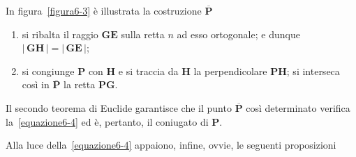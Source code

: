 In figura~\ref{figura6-3} è illustrata la costruzione $\overline{\mathbf{P}}$
\begin{enumerate}
\item si ribalta il raggio $\mathbf{G}\mathbf{E}$ sulla retta $n$ ad esso ortogonale; e dunque $\lvert\,\mathbf{G}\mathbf{H}\,\lvert = \lvert\,\mathbf{G}\mathbf{E}\,\lvert$;
\item si congiunge $\mathbf{P}$ con $\mathbf{H}$ e si traccia da $\mathbf{H}$ la perpendicolare $\mathbf{P}\mathbf{H}$; si interseca così in $\overline{\mathbf{P}}$ la retta $\mathbf{P}\mathbf{G}$.
\end{enumerate}
Il secondo teorema di Euclide garantisce che il punto $\overline{\mathbf{P}}$ così determinato verifica la~\eqref{equazione6-4} ed è, pertanto, il coniugato di $\mathbf{P}$. 

\noindent Alla luce della~\eqref{equazione6-4} appaiono, infine, ovvie, le seguenti proposizioni
\\

\\
\\
%

\\
\\

